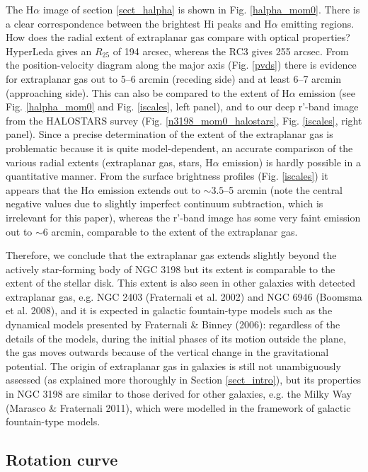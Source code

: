 \documentclass[traditabstract]{aa}
\begin{document}
The H$\alpha$ image of section \ref{sect_halpha}
is shown in Fig. \ref{halpha_mom0}. There is a
clear correspondence between the brightest H{\sc i} peaks and H$\alpha$
emitting regions. 
How does the radial extent of extraplanar gas compare with optical
properties? HyperLeda gives an $R_{25}$ of 194 arcsec, whereas the RC3
gives 255 arcsec. From the position-velocity diagram along the major
axis (Fig. \ref{pvds}) there is evidence for extraplanar gas out to
5--6 arcmin (receding side) and at least 6--7 arcmin (approaching
side). This can also be compared to the extent of H$\alpha$ emission
(see Fig. \ref{halpha_mom0} and Fig. \ref{iscales}, left panel), and to
our deep r'-band image from the HALOSTARS survey
(Fig. \ref{n3198_mom0_halostars}, Fig. \ref{iscales}, right
panel). Since a precise determination of the extent of the extraplanar
gas is problematic because it is quite model-dependent, an accurate
comparison of the various radial extents (extraplanar gas, stars,
H$\alpha$ emission) is hardly possible in a quantitative manner. From
the surface brightness profiles (Fig. \ref{iscales}) it appears that the H$\alpha$
emission extends out to $\sim 3.5$--5 arcmin (note the central negative
values due to slightly imperfect continuum subtraction, which is
irrelevant for this paper), whereas the r'-band image has some very
faint emission out to $\sim$6 arcmin, comparable to the extent of the
extraplanar gas. 

Therefore, we conclude that the extraplanar gas
extends slightly beyond the actively star-forming body of NGC 3198 but its
extent is comparable to the extent of the stellar disk. This extent
is also seen in other galaxies with detected extraplanar gas, e.g. NGC
2403 (Fraternali et al. 2002) and NGC 6946 (Boomsma et al. 2008), and
it is expected in galactic fountain-type models such as the dynamical
models presented by Fraternali \& Binney (2006): regardless of the
details of the models, during the initial phases of its motion outside
the plane, the gas moves outwards because of the vertical change in
the gravitational potential. The origin of extraplanar gas in galaxies is
still not unambiguously assessed (as explained more thoroughly in
Section \ref{sect_intro}), but its properties in NGC 3198 are 
similar to those derived for other galaxies, e.g. the Milky Way (Marasco \& Fraternali
2011), which were modelled in the framework of galactic fountain-type
models.



\subsection{Rotation curve}
\end{document}
